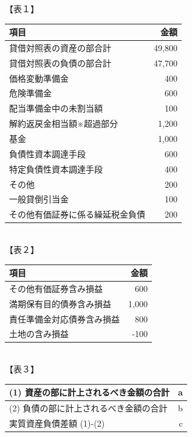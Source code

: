 \documentclass[report,gutter=10mm,fore-edge=10mm,uplatex,dvipdfmx]{jlreq}
\begin{document}
【表１】\\
\begin{tabular}{|l|r|}
\hline 項目&金額\\ \hline \hline
貸借対照表の資産の部合計&49,800\\ \hline
貸借対照表の負債の部合計&47,700\\ \hline
価格変動準備金&400\\ \hline
危険準備金&600\\ \hline
配当準備金中の未割当額&100\\ \hline
解約返戻金相当額※超過部分&1,200\\ \hline
基金&1,000\\ \hline
負債性資本調達手段&600\\ \hline
特定負債性資本調達手段&400\\ \hline
その他&200\\ \hline
一般貸倒引当金&100\\ \hline
その他有価証券に係る繰延税金負債&200\\ \hline
\end{tabular}\\

【表２】\\
\begin{tabular}{|l|r|}
\hline
 項目&金額\\\hline\hline
その他有価証券含み損益&600\\ \hline
満期保有目的債券含み損益&1,000\\ \hline
責任準備金対応債券含み損益&800\\ \hline
土地の含み損益&-100\\ \hline
\end{tabular}\\ 

【表３】\\
\begin{tabular}{|l|r|}
\hline
 (1) 資産の部に計上されるべき金額の合計& a\\ \hline
 (2) 負債の部に計上されるべき金額の合計& b\\\hline
 実質資産負債差額 (1)-(2) & c\\\hline
\end{tabular}

\answer{}
\end{document}
